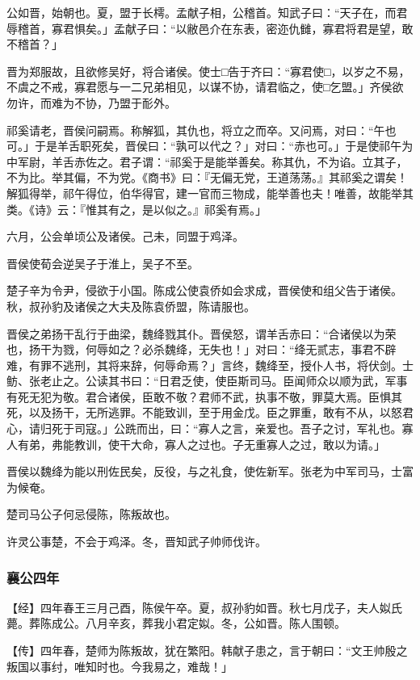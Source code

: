 \documentclass[]{article}
\begin{document}
公如晋，始朝也。夏，盟于长樗。孟献子相，公稽首。知武子曰：``天子在，而君辱稽首，寡君惧矣。」孟献子曰：``以敝邑介在东表，密迩仇雠，寡君将君是望，敢不稽首？」

晋为郑服故，且欲修吴好，将合诸侯。使士□告于齐曰：``寡君使□，以岁之不易，不虞之不戒，寡君愿与一二兄弟相见，以谋不协，请君临之，使□乞盟。」齐侯欲勿许，而难为不协，乃盟于耏外。

祁奚请老，晋侯问嗣焉。称解狐，其仇也，将立之而卒。又问焉，对曰：``午也可。」于是羊舌职死矣，晋侯曰：``孰可以代之？」对曰：``赤也可。」于是使祁午为中军尉，羊舌赤佐之。君子谓：``祁奚于是能举善矣。称其仇，不为谄。立其子，不为比。举其偏，不为党。《商书》曰：『无偏无党，王道荡荡。』其祁奚之谓矣！解狐得举，祁午得位，伯华得官，建一官而三物成，能举善也夫！唯善，故能举其类。《诗》云：『惟其有之，是以似之。』祁奚有焉。」

六月，公会单顷公及诸侯。己未，同盟于鸡泽。

晋侯使荀会逆吴子于淮上，吴子不至。

楚子辛为令尹，侵欲于小国。陈成公使袁侨如会求成，晋侯使和组父告于诸侯。秋，叔孙豹及诸侯之大夫及陈袁侨盟，陈请服也。

晋侯之弟扬干乱行于曲梁，魏绛戮其仆。晋侯怒，谓羊舌赤曰：``合诸侯以为荣也，扬干为戮，何辱如之？必杀魏绛，无失也！」对曰：``绛无贰志，事君不辟难，有罪不逃刑，其将来辞，何辱命焉？」言终，魏绛至，授仆人书，将伏剑。士鲂、张老止之。公读其书曰：``日君乏使，使臣斯司马。臣闻师众以顺为武，军事有死无犯为敬。君合诸侯，臣敢不敬？君师不武，执事不敬，罪莫大焉。臣惧其死，以及扬干，无所逃罪。不能致训，至于用金戊。臣之罪重，敢有不从，以怒君心，请归死于司寇。」公跣而出，曰：``寡人之言，亲爱也。吾子之讨，军礼也。寡人有弟，弗能教训，使干大命，寡人之过也。子无重寡人之过，敢以为请。」

晋侯以魏绛为能以刑佐民矣，反役，与之礼食，使佐新军。张老为中军司马，士富为候奄。

楚司马公子何忌侵陈，陈叛故也。

许灵公事楚，不会于鸡泽。冬，晋知武子帅师伐许。

\hypertarget{header-n1846}{%
\subsubsection{襄公四年}\label{header-n1846}}

【经】四年春王三月己酉，陈侯午卒。夏，叔孙豹如晋。秋七月戊子，夫人姒氏薨。葬陈成公。八月辛亥，葬我小君定姒。冬，公如晋。陈人围顿。

【传】四年春，楚师为陈叛故，犹在繁阳。韩献子患之，言于朝曰：``文王帅殷之叛国以事纣，唯知时也。今我易之，难哉！」
\end{document}
